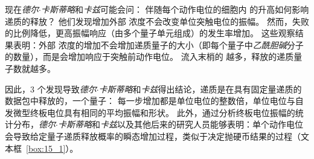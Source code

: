 现在\textit{德尔$\cdot$卡斯蒂略}和\textit{卡兹}可能会问：
伴随每个动作电位的细胞内  的升高如何影响递质的释放？
他们发现增加外部  浓度不会改变单位突触电位的振幅。
然而，失败的比例降低，更高振幅响应（由多个量子单元组成）的发生率增加。
这些观察结果表明：外部  浓度的增加不会增加递质量子的大小（即每个量子中\textit{乙酰胆碱}分子的数量），而是会增加响应于突触前动作电位。
流入末梢的  越多，释放的递质量子数就越多。


因此，3 个发现导致\textit{德尔$\cdot$卡斯蒂略}和\textit{卡兹}得出结论，递质是在具有固定量递质的数据包中释放的，一个量子：
每一步增加都是单位电位的整数倍，单位电位与自发微型终板电位具有相同的平均振幅和形状。
此外，通过分析终板电位振幅的统计分布，\textit{德尔$\cdot$卡斯蒂略}和\textit{卡兹}以及其他后来的研究人员能够表明：单个动作电位会导致给定量子递质释放概率的瞬态增加过程，类似于决定抛硬币结果的过程（文本框~\ref{box:15_1}）。


